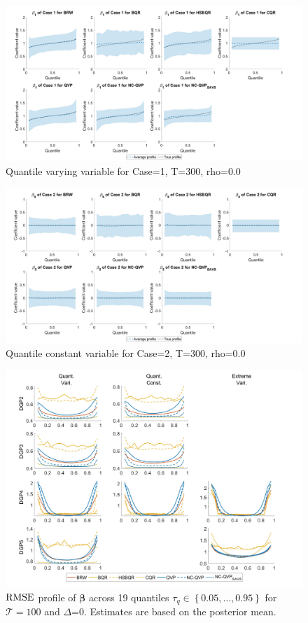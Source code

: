 \begin{figure}[H]
    \centering
    \includegraphics[width=\linewidth]{Figures/PresFig1_T=300.jpg}
    \caption{Quantile varying variable for Case=1, T=300, rho=0.0}
    \label{fig:DGP1}
\end{figure}

\begin{figure}[H]
    \centering
    \includegraphics[width=\linewidth]{Figures/PresFig2_T=300.jpg}
    \caption{Quantile constant variable for Case=2, T=300, rho=0.0}
    \label{fig:DGP2}
\end{figure}

%
\begin{figure}[H]
    \centering
    \includegraphics[width=0.9\linewidth]{AppFig/CoeffBiasSpecificv3_T100.jpg}
    \caption{$\operatorname{RMSE}$ profile of $\boldsymbol{\beta}$ across 19 quantiles $\tau_q \in \left\{0.05,\dotsc,0.95\right\}$ for $\mathcal{T}=100$ and $\varDelta$=0. Estimates are based on the posterior mean.}
    \label{fig:SpecCoeffBias_T100}
\end{figure}

